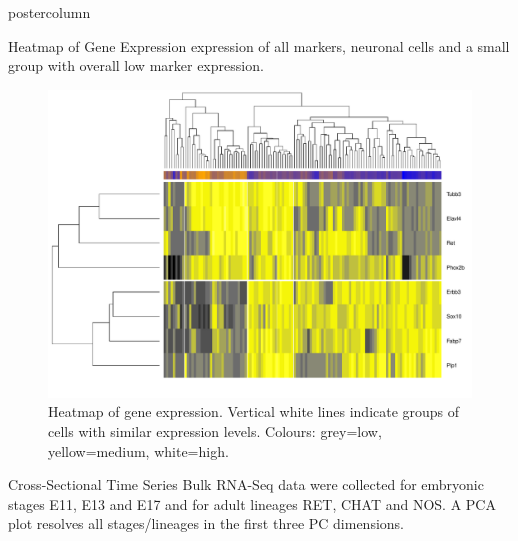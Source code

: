 \documentclass{beamer}
\begin{document}
\begin{frame}
\begin{columns}
\begin{column}{.45\textwidth}
\begin{beamercolorbox}[center]{postercolumn}
\begin{minipage}{.98\textwidth}
{\begin{myblock}{Heatmap of Gene Expression }
expression of all markers, neuronal cells and a small group with overall
low marker expression.
\begin{figure}
\begin{minipage}{1.0\textwidth}
	\includegraphics[width=1.0\textwidth]{./heatmap}
	\caption{Heatmap of gene expression. Vertical white lines indicate groups
			of cells with similar expression levels. Colours: grey=low,
			yellow=medium, white=high.}
	\label{fig:heatmap}
\end{minipage}
\end{figure}
\end{myblock}\vfill
\begin{myblock}{Cross-Sectional Time Series}
Bulk RNA-Seq data were collected for embryonic stages E11, E13 and E17 and
for adult lineages RET, CHAT and NOS. A PCA plot resolves all stages/lineages
in the first three PC dimensions.
\begin{figure}
\begin{minipage}{1.0\textwidth}

\end{minipage}
\end{figure}
\end{myblock}}
\end{minipage}
\end{beamercolorbox}
\end{column}
\end{columns}
\end{frame}
\end{document}
